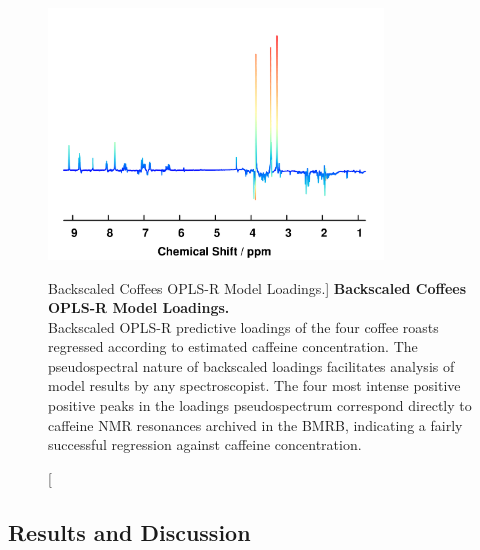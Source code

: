 \begin{figure}
\includegraphics[width=3.5in]{figs/apps/04-oplsr-p.png}
\caption
      [Backscaled Coffees OPLS-R Model Loadings.]{
  {\bf Backscaled Coffees OPLS-R Model Loadings.}
  \\
  Backscaled OPLS-R predictive loadings of the four coffee roasts regressed
  according to estimated caffeine concentration. The pseudospectral nature of
  backscaled loadings facilitates analysis of model results by any
  spectroscopist. The four most intense positive positive peaks in the
  loadings pseudospectrum correspond directly to caffeine NMR resonances
  archived in the BMRB, indicating a fairly successful regression against
  caffeine concentration.
}
\end{figure}

\subsection{Results and Discussion}


